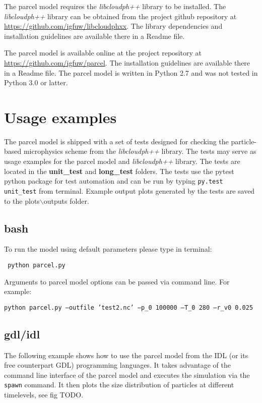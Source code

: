 \documentclass[11pt]{article}
\newcommand{\prog}[1]{{\tt#1}}
\begin{document}
The parcel model requires the \emph{libcloudph++} library to be installed. 
The \emph{libcloudph++} library can be obtained from the project github repository 
  at \url{https://github.com/igfuw/libcloudphxx}.
The library dependencies and installation guidelines are available there in a Readme file.

The parcel model is available online at the project repository at \url{https://github.com/igfuw/parcel}.
The installation guidelines are available there in a Readme file.
The parcel model is written in Python 2.7 and was not tested in Python 3.0 or latter.

\section{Usage examples}

The parcel model is shipped with a set of tests designed for checking the particle-based microphysics scheme
  from the \emph{libcloudph++} library.
The tests may serve as usage examples for the parcel model and \emph{libcloudph++} library.
The tests are located in the {\bf unit\_test} and {\bf long\_test} folders.
The tests use the pytest python package for test automation and can be run by typing  \prog{py.test unit\_test} 
  from terminal.
Example output plots generated by the tests are saved to the plots$\backslash$outputs folder.

\subsection{bash}

\noindent
To run the model using default parameters please type in terminal:

\vspace{0.35cm}
  \prog{ python parcel.py}
\vspace{0.35cm}

\noindent
Arguments to parcel model options can be passed via command line. For example:

\vspace{0.35cm}
 \prog{python parcel.py \texttt{--}outfile 'test2.nc' \texttt{--}p\_0 100000 \texttt{--}T\_0 280 \texttt{--}r\_v0 0.025}
\vspace{0.35cm}

\subsection{gdl/idl}

The following example shows how to use the parcel model from the IDL (or its free counterpart GDL)
   programming languages. 
It takes advantage of the command line interface of the parcel model
  and executes the simulation via the \prog{spawn} command.
It then plots the size distribution of particles at different timelevels, see fig TODO.
\end{document}
